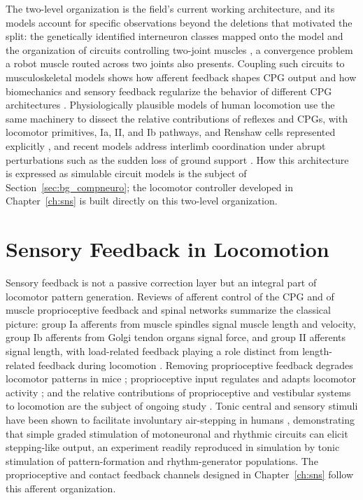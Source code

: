 The two-level organization is the field's current working architecture, and its models account for specific observations beyond the deletions that motivated the split: the genetically identified interneuron classes mapped onto the model \citep{rybak_organization_2015} and the organization of circuits controlling two-joint muscles \citep{shevtsova_modeling_2016}, a convergence problem a robot muscle routed across two joints also presents. Coupling such circuits to musculoskeletal models shows how afferent feedback shapes CPG output \citep{markin_afferent_2010} and how biomechanics and sensory feedback regularize the behavior of different CPG architectures \citep{deng_biomechanical_2022}. Physiologically plausible models of human locomotion use the same machinery to dissect the relative contributions of reflexes and CPGs, with locomotor primitives, Ia, II, and Ib pathways, and Renshaw cells represented explicitly \citep{dirusso_investigating_2023}, and recent models address interlimb coordination under abrupt perturbations such as the sudden loss of ground support \citep{shinohara_mechanisms_2025}. How this architecture is expressed as simulable circuit models is the subject of Section~\ref{sec:bg_compneuro}; the locomotor controller developed in Chapter~\ref{ch:sns} is built directly on this two-level organization.


\section{Sensory Feedback in Locomotion}\label{sec:bg_sensory}

Sensory feedback is not a passive correction layer but an integral part of locomotor pattern generation. Reviews of afferent control of the CPG \citep{van_de_crommert_review_1998} and of muscle proprioceptive feedback and spinal networks \citep{windhorst_muscle_2007, windhorst_spinal_2022} summarize the classical picture: group Ia afferents from muscle spindles signal muscle length and velocity, group Ib afferents from Golgi tendon organs signal force, and group II afferents signal length, with load-related feedback playing a role distinct from length-related feedback during locomotion \citep{dietz_significance_2000}. Removing proprioceptive feedback degrades locomotor patterns in mice \citep{akay_degradation_2014}; proprioceptive input regulates and adapts locomotor activity \citep{lam_role_2002}; and the relative contributions of proprioceptive and vestibular systems to locomotion are the subject of ongoing study \citep{akay_relative_2021, akay_sensory_2020}. Tonic central and sensory stimuli have been shown to facilitate involuntary air-stepping in humans \citep{selionov_tonic_2009}, demonstrating that simple graded stimulation of motoneuronal and rhythmic circuits can elicit stepping-like output, an experiment readily reproduced in simulation by tonic stimulation of pattern-formation and rhythm-generator populations. The proprioceptive and contact feedback channels designed in Chapter~\ref{ch:sns} follow this afferent organization.

